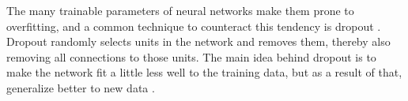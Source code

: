The many trainable parameters of neural networks make them prone to overfitting, and a common technique to counteract this tendency is dropout \cite{smlbook}. Dropout randomly selects units in the network and removes them, thereby also removing all connections to those units. The main idea behind dropout is to make the network fit a little less well to the training data, but as a result of that, generalize better to new data \cite{smlbook}. 












